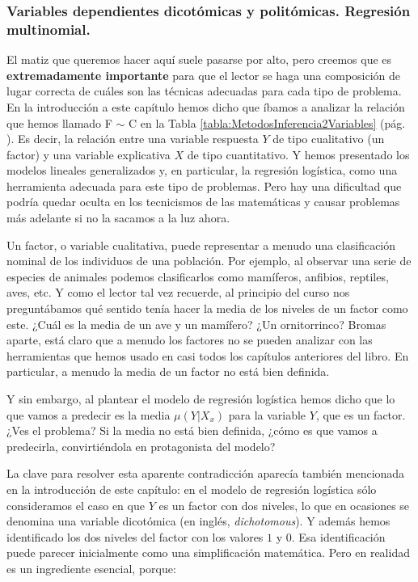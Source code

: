 \subsubsection*{Variables dependientes dicotómicas y politómicas. Regresión multinomial.}
	\label{cap13:subsubsec:VariablesDicotomicasPolitomicasRegresionMultinomial}
	
	El matiz que queremos hacer aquí suele pasarse por alto, pero creemos que es {\bf extremadamente importante} para que el lector se haga una composición de lugar correcta de cuáles son las técnicas adecuadas para cada tipo de problema. En la introducción a este capítulo hemos dicho que íbamos a analizar la relación que hemos llamado F $\sim$ C en la Tabla \ref{tabla:MetodosInferencia2Variables} (pág. \pageref{tabla:MetodosInferencia2Variables}). Es decir, la relación entre una variable respuesta $Y$ de tipo cualitativo (un factor) y una variable explicativa $X$ de tipo cuantitativo. Y hemos presentado los modelos lineales generalizados y, en particular, la regresión logística, como una herramienta adecuada para este tipo de problemas. Pero hay una dificultad que podría quedar oculta en los tecnicismos de las matemáticas y causar problemas más adelante si no la sacamos a la luz ahora.
	
	Un factor, o variable cualitativa, puede representar a menudo una clasificación nominal de los individuos de una población. Por ejemplo, al observar una serie de especies de animales podemos clasificarlos como mamíferos, anfibios, reptiles, aves, etc. Y como el lector tal vez recuerde, al principio del curso nos preguntábamos qué sentido tenía hacer la media de  los niveles de un factor como este. ¿Cuál es la media de un ave y un mamífero? ¿Un ornitorrinco? Bromas aparte, está claro que a menudo los factores no se pueden analizar con las herramientas que hemos usado en casi todos los capítulos anteriores del libro. En particular, a menudo la media de un factor no está bien definida.
	
	Y sin embargo, al plantear el modelo de regresión logística hemos dicho que lo que vamos a predecir es la media $\mu(Y|X_x)$ para la variable $Y$, que es un factor. ¿Ves el problema? Si la media no está bien definida, ¿cómo es que vamos a predecirla, convirtiéndola en protagonista del modelo?
	
	La clave para resolver esta aparente contradicción aparecía también mencionada en la introducción de este capítulo: en el modelo de regresión  logística sólo consideramos el caso en que $Y$ es un factor con dos niveles, lo que en ocasiones se denomina una variable dicotómica (en inglés, {\em dichotomous}). Y además hemos identificado los dos niveles del factor con los valores $1$ y $0$.  Esa identificación puede parecer inicialmente como una simplificación matemática. Pero en realidad es un ingrediente esencial, porque:
	

